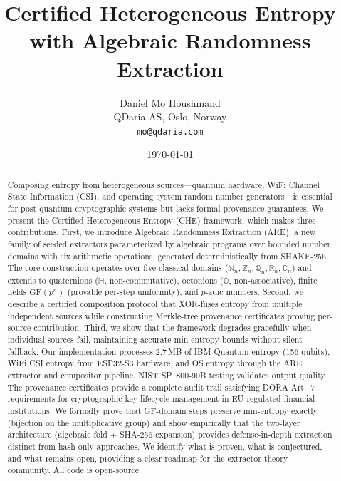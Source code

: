 \documentclass[11pt,a4paper]{article}
\title{Certified Heterogeneous Entropy with Algebraic Randomness Extraction}
\author{Daniel Mo Houshmand \\
  QDaria AS, Oslo, Norway \\
  \texttt{mo@qdaria.com}}
\date{\today}
\newcommand{\are}{\textsc{ARE}\xspace}
\newcommand{\che}{\textsc{CHE}\xspace}
\newcommand{\N}{\mathbb{N}}
\newcommand{\Z}{\mathbb{Z}}
\newcommand{\Q}{\mathbb{Q}}
\newcommand{\R}{\mathbb{R}}
\newcommand{\CC}{\mathbb{C}}
\begin{document}
\maketitle

\begin{abstract}
Composing entropy from heterogeneous sources---quantum hardware,
WiFi Channel State Information (CSI), and operating system random
number generators---is essential for post-quantum cryptographic
systems but lacks formal provenance guarantees.
%
We present the Certified Heterogeneous Entropy (\che) framework,
which makes three contributions.
%
First, we introduce Algebraic Randomness Extraction (\are), a new
family of seeded extractors parameterized by algebraic programs over
bounded number domains with six arithmetic operations, generated
deterministically from SHAKE-256.
%
The core construction operates over five classical domains
($\N_n, \Z_n, \Q_n, \R_n, \CC_n$) and extends to quaternions
($\mathbb{H}$, non-commutative), octonions ($\mathbb{O}$,
non-associative), finite fields $\mathrm{GF}(p^n)$ (provable
per-step uniformity), and $p$-adic numbers.
%
Second, we describe a certified composition protocol that XOR-fuses
entropy from multiple independent sources while constructing
Merkle-tree provenance certificates proving per-source contribution.
%
Third, we show that the framework degrades gracefully when individual
sources fail, maintaining accurate min-entropy bounds without silent
fallback.
%
Our implementation processes 2.7\,MB of IBM Quantum entropy (156
qubits), WiFi CSI entropy from ESP32-S3 hardware, and OS entropy
through the \are extractor and compositor pipeline.
%
NIST SP~800-90B testing validates output quality.
%
The provenance certificates provide a complete audit trail satisfying
DORA Art.~7 requirements for cryptographic key lifecycle management
in EU-regulated financial institutions.
%
We formally prove that GF-domain steps preserve min-entropy
exactly (bijection on the multiplicative group) and show
empirically that the two-layer architecture (algebraic fold +
SHA-256 expansion) provides defense-in-depth extraction
distinct from hash-only approaches.
%
We identify what is proven, what is conjectured, and what
remains open, providing a clear roadmap for the extractor
theory community.
%
All code is open-source.
\end{abstract}
\end{document}
